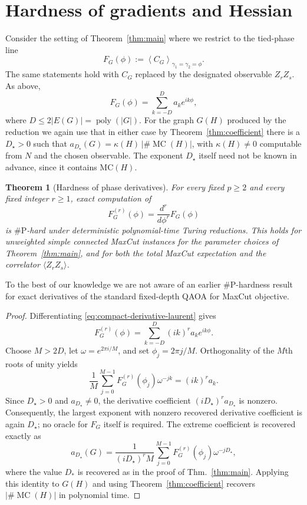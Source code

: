 \documentclass[11pt]{article}
\newtheorem{theorem}{Theorem}[section]
\newcommand{\mc}{\operatorname{MC}}
\newcommand{\M}{\#\mc}
\newcommand{\sh}[1]{{#1}}
\begin{document}
\section{Hardness of gradients and Hessian}
\label{sec:derivative-hardness}

Consider the setting of Theorem~\ref{thm:main} where we restrict to the
tied-phase line
\[
  F_G(\phi)
  :=
  \left\langle C_G\right\rangle_{\gamma_1=\gamma_2=\phi}.
\]
The same statements hold with $C_G$ replaced by the designated observable
$Z_rZ_s$.  As above,
\begin{equation}
  F_G(\phi)=\sum_{k=-D}^{D} a_ke^{ik\phi},
  \label{eq:compact-derivative-laurent}
\end{equation}
where $D\leq 2|E(G)|=\operatorname{poly}(|G|)$.  For the graph $G(H)$ produced by the
reduction %
we again use that in either case 
by Theorem~\ref{thm:coefficient} there is %
a $D_\star>0$ such that
  $a_{D_\star}(G)
  =
  \kappa(H)\,|\M(H)|$, with 
  $\kappa(H)\neq 0$ computable from \(N\) and the chosen
observable. \sh{The exponent \(D_\star\) itself need not be known in
advance, since it contains \(\mathrm{MC}(H)\).}

\begin{theorem}[Hardness of phase derivatives]
\label{thm:compact-derivative-hardness}
For every fixed $p\ge2$ and every fixed integer $r\ge1$, exact computation
of
\[
  F_G^{(r)}(\phi)=\frac{d^r}{d\phi^r}F_G(\phi)
\]
is $\#\mathrm{P}$-hard under deterministic polynomial-time Turing
reductions.  This holds for unweighted simple connected MaxCut instances 
for the parameter choices of  Theorem~\ref{thm:main}, and for both the
total MaxCut expectation and the correlator $\langle Z_rZ_s\rangle$.
\end{theorem}



To the best of our knowledge we are not aware of an
earlier \(\#\mathrm P\)-hardness result for exact derivatives of the
standard fixed-depth QAOA for MaxCut objective.

\begin{proof} %
Differentiating \eqref{eq:compact-derivative-laurent} gives
\[
  F_G^{(r)}(\phi)
  =
  \sum_{k=-D}^{D}(ik)^r a_ke^{ik\phi}.
\]
Choose $M>2D$, let $\omega=e^{2\pi i/M}$, and set
$\phi_j=2\pi j/M$.  Orthogonality of the $M$th roots of unity yields
\[
  \frac1M\sum_{j=0}^{M-1}
  F_G^{(r)}(\phi_j)\omega^{-jk}
  =
  (ik)^r a_k.
\]
Since $D_\star>0$ and \(a_{D_\star}\ne0\),  the derivative
coefficient $ (iD_\star)^r a_{D_\star}$ is nonzero. Consequently, the largest exponent with nonzero recovered
derivative coefficient is again \(D_\star\); no oracle for \(F_G\)
itself is required. 
The extreme coefficient is recovered exactly as
\[
  a_{D_\star}(G)
  =
  \frac{1}{(iD_\star)^rM}
  \sum_{j=0}^{M-1}
  F_G^{(r)}(\phi_j)\omega^{-jD_\star},
\]
where the value $D_*$ is recovered as in the proof of Thm.~\ref{thm:main}. 
Applying this identity to $G(H)$ and using
Theorem~\ref{thm:coefficient}
recovers
$|\M(H)|$ in polynomial time.
\end{proof}
\end{document}
